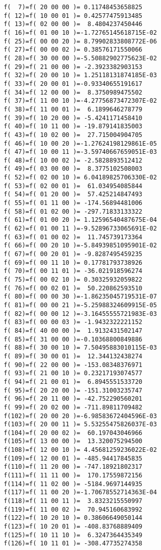 \begin{footnotesize}
\begin{verbatim}
 f(  7)=f( 20 00 00 )= 0.11748453658825
 f( 12)=f( 10 00 01 )= 0.42577475913485
 f( 13)=f( 02 00 00 )=  8.4804237450446
 f( 16)=f( 01 00 10 )=-1.72765145618715E-02
 f( 25)=f( 00 00 20 )= 8.79902833808772E-06
 f( 27)=f( 00 00 02 )= 0.38576171550066
 f( 28)=f( 30 00 00 )=-5.50882902775623E-02
 f( 29)=f( 21 00 00 )= -2.3923382903153
 f( 32)=f( 20 00 10 )= 1.25118131874185E-03
 f( 33)=f( 20 00 01 )=-0.93340655191617
 f( 34)=f( 12 00 00 )=  8.3750989475502
 f( 37)=f( 11 00 10 )=-4.27756873472307E-02
 f( 38)=f( 11 00 01 )=  6.1899646278779
 f( 39)=f( 10 20 00 )= -5.4241171458410
 f( 40)=f( 10 11 00 )= -19.879141835003
 f( 43)=f( 10 02 00 )=  27.715004904705
 f( 46)=f( 10 00 20 )=-1.27624198129861E-05
 f( 47)=f( 10 00 11 )=-3.59740667659051E-03
 f( 48)=f( 10 00 02 )= -2.5828893512412
 f( 49)=f( 03 00 00 )=  8.3775102508003
 f( 52)=f( 02 00 10 )= 6.04189825706330E-02
 f( 53)=f( 02 00 01 )=  61.034954085844
 f( 54)=f( 01 20 00 )=  57.425214847493
 f( 55)=f( 01 11 00 )= -174.56894481006
 f( 58)=f( 01 02 00 )= -297.71833133322
 f( 61)=f( 01 00 20 )= 1.12596540487675E-04
 f( 62)=f( 01 00 11 )=-9.52896733065691E-02
 f( 63)=f( 01 00 02 )=  11.745739173364
 f( 66)=f( 00 20 10 )=-5.84939851095901E-02
 f( 67)=f( 00 20 01 )= -9.8287495459235
 f( 69)=f( 00 11 10 )= 0.17781793738926
 f( 70)=f( 00 11 01 )= -36.021918596274
 f( 75)=f( 00 02 10 )= 0.30325932059822
 f( 76)=f( 00 02 01 )=  50.220862593510
 f( 80)=f( 00 00 30 )=-1.86235045719531E-07
 f( 81)=f( 00 00 21 )=-5.25988324609915E-05
 f( 82)=f( 00 00 12 )=-3.16455555721983E-03
 f( 83)=f( 00 00 03 )= -1.9432322221152
 f( 84)=f( 40 00 00 )=  1.9132431502147
 f( 85)=f( 31 00 00 )=-0.10368800849886
 f( 88)=f( 30 00 10 )= 7.50495883010115E-03
 f( 89)=f( 30 00 01 )=  12.344132438274
 f( 90)=f( 22 00 00 )= -153.08348376971
 f( 93)=f( 21 00 10 )= 0.23217193074577
 f( 94)=f( 21 00 01 )=  6.8945551533720
 f( 95)=f( 20 20 00 )= -151.31003235747
 f( 96)=f( 20 11 00 )= -42.752290560201
 f( 99)=f( 20 02 00 )= -711.89811709482
 f(102)=f( 20 00 20 )=-6.98583672404596E-03
 f(103)=f( 20 00 11 )= 5.53255475826037E-03
 f(104)=f( 20 00 02 )=  60.197043046966
 f(105)=f( 13 00 00 )=  13.320075294500
 f(108)=f( 12 00 10 )= 4.45681259236022E-02
 f(109)=f( 12 00 01 )= -485.94417845835
 f(110)=f( 11 20 00 )= -747.18921802317
 f(111)=f( 11 11 00 )=  170.17559872156
 f(114)=f( 11 02 00 )= -5184.9697144935
 f(117)=f( 11 00 20 )=-1.70678552714363E-04
 f(118)=f( 11 00 11 )=  3.8323215550997
 f(119)=f( 11 00 02 )=  70.945160683992
 f(122)=f( 10 20 10 )= 0.38606649050144
 f(123)=f( 10 20 01 )= -408.83768889409
 f(125)=f( 10 11 10 )=  6.3247364435349
 f(126)=f( 10 11 01 )= -308.47735274358

\end{verbatim}
\end{footnotesize}
